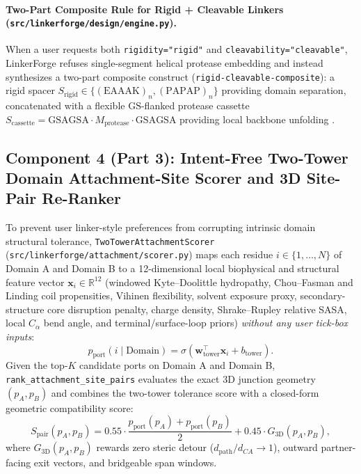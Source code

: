 \documentclass[11pt]{article}
\begin{document}
\paragraph{Two-Part Composite Rule for Rigid + Cleavable Linkers (\texttt{src/linkerforge/design/engine.py}).}
When a user requests both \texttt{rigidity="rigid"} and \texttt{cleavability="cleavable"}, LinkerForge refuses single-segment helical protease embedding and instead synthesizes a two-part composite construct (\texttt{rigid-cleavable-composite}): a rigid spacer $S_{\text{rigid}} \in \{(\text{EAAAK})_n, (\text{PAPAP})_n\}$ providing domain separation, concatenated with a flexible $\text{GS}$-flanked protease cassette $S_{\text{cassette}} = \text{GSAGSA}\cdot M_{\text{protease}} \cdot\text{GSAGSA}$ providing local backbone unfolding \cite{hubbard1994proteolysis,chen2013fusion}.

\subsection{Component 4 (Part 3): Intent-Free Two-Tower Domain Attachment-Site Scorer and 3D Site-Pair Re-Ranker}
\label{sec:method_part3}

To prevent user linker-style preferences from corrupting intrinsic domain structural tolerance, \texttt{TwoTowerAttachmentScorer} (\texttt{src/linkerforge/attachment/scorer.py}) maps each residue $i \in \{1, \dots, N\}$ of Domain A and Domain B to a 12-dimensional local biophysical and structural feature vector $\mathbf{x}_i \in \mathbb{R}^{12}$ (windowed Kyte--Doolittle hydropathy, Chou--Fasman and Linding coil propensities, Vihinen flexibility, solvent exposure proxy, secondary-structure core disruption penalty, charge density, Shrake--Rupley relative SASA, local $C_\alpha$ bend angle, and terminal/surface-loop priors) \emph{without any user tick-box inputs}:
\begin{equation}
  p_{\text{port}}(i \mid \text{Domain}) = \sigma\!\left(\mathbf{w}_{\text{tower}}^\top \mathbf{x}_i + b_{\text{tower}}\right).
\end{equation}
Given the top-$K$ candidate ports on Domain A and Domain B, \texttt{rank\_attachment\_site\_pairs} evaluates the exact 3D junction geometry $(p_A, p_B)$ and combines the two-tower tolerance score with a closed-form geometric compatibility score:
\begin{equation}
  S_{\text{pair}}(p_A, p_B) = 0.55 \cdot \frac{p_{\text{port}}(p_A) + p_{\text{port}}(p_B)}{2} + 0.45 \cdot G_{3\text{D}}(p_A, p_B),
\end{equation}
where $G_{3\text{D}}(p_A, p_B)$ rewards zero steric detour ($d_{\text{path}}/d_{CA} \to 1$), outward partner-facing exit vectors, and bridgeable span windows.
\end{document}
